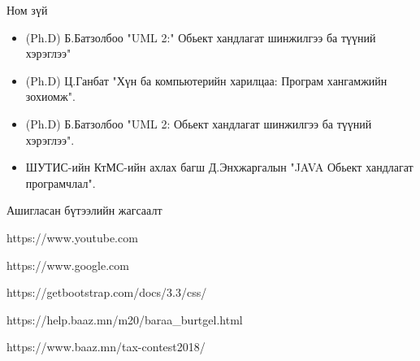 

\label{AppendixA} %
\begin{center}
Ном зүй 
\end{center}
\begin{itemize}
	\item (Ph.D) Б.Батзолбоо "UML 2:" Обьект хандлагат шинжилгээ ба түүний хэрэглээ" 
\end{itemize}
\begin{itemize}
	\item (Ph.D) Ц.Ганбат "Хүн ба компьютерийн харилцаа: Програм хангамжийн зохиомж". 
\end{itemize}
\begin{itemize}
	\item (Ph.D) Б.Батзолбоо "UML 2: Обьект хандлагат шинжилгээ ба түүний хэрэглээ". 
\end{itemize}
\begin{itemize}
	\item ШУТИС-ийн КтМС-ийн ахлах багш Д.Энхжаргалын "JAVA Обьект хандлагат програмчлал". 
\end{itemize}


\begin{center}
Ашигласан бүтээлийн жагсаалт
\end{center}
 


https://www.youtube.com


https://www.google.com



https://getbootstrap.com/docs/3.3/css/



https://help.baaz.mn/m20/baraa_burtgel.html




https://www.baaz.mn/tax-contest2018/